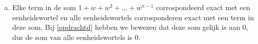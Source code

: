 \documentclass[12pt, a4paper]{article}
\begin{document}
\begin{enumerate}[(a).]
    \begin{proof}
        $ $\newline
        Neem $S = 1 + w + w^2 + \dots + w^{n - 1}$. \newline
        Dan $S \cdot w = w + w^2 + \dots + w^n = S - 1 + w^n$.

        Stel $S \cdot w = 0$. \newline
        Dan $S - 1 + w^n = 0$. \newline
        Omdat $w^n = {(e^{\frac{2\pi i}{n}})}^n = e^{2\pi i} = 1$, $S - 1 + 1 = 0$ geeft: \newline
        $S = 1 + w + w^2 + \dots + w^{n - 1} = 0$.
    \end{proof}

    \item 
    Elke term in de som $1 + w + w^2 + \dots + w^{n - 1}$ corrospondeerd exact met een eenheidswortel en alle eenheidswortels corrosponderen exact met een term in deze som. Bij \ref{opdrachtd} \!hebben we bewezen dat deze som gelijk is aan 0, dus de som van alle eenheidswortels is 0.
\end{enumerate}
\end{document}
